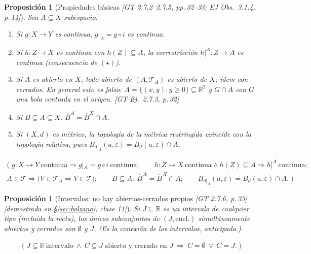 \documentclass[11pt,a4paper]{article}
\newcommand{\lgc}[1]{\par\vspace{-3pt}\begin{gather*}\big(\;#1\;\big)\end{gather*}\vspace{-6pt}}
\theoremstyle{definition}
\theoremstyle{plain}
\newtheorem{proposicion}[definicion]{Proposición}
\newcommand{\fnt}[1]{{\normalfont\small\itshape\color{gray!150!black}[#1]}}
\newcommand{\R}{\mathbb{R}}
\newcommand{\cl}[1]{\overline{#1}}
\newcommand{\Bola}[2]{B_d(#1,#2)}
\newcommand{\tp}{\mathcal{T}}
\begin{document}
\begin{proposicion}[Propiedades básicas \fnt{GT 2.7.2--2.7.5, pp.\,32--33; EJ Obs.\ 3.1.4, p.\,14}]\label{pr:subesp}
Sea $A\subseteq X$ subespacio.
\begin{enumerate}[label=(\roman*),leftmargin=2.2em,itemsep=0pt]
\item Si $g:X\to Y$ es continua, $g|_A=g\circ i$ es continua.
\item Si $h:Z\to X$ es continua con $h(Z)\subseteq A$, la correstricción $h|^A:Z\to A$ es continua (consecuencia de $(\star)$).
\item Si $A$ es abierto en $X$, todo abierto de $(A,\tp_A)$ es abierto de $X$; ídem con cerrados. En general esto es falso: $A=\{(x,y):y\ge0\}\subseteq\R^2$ y $G\cap A$ con $G$ una bola centrada en el origen. \fnt{GT Ej.\ 2.7.3, p.\,32}
\item Si $B\subseteq A\subseteq X$: $\cl{B}^{A}=\cl{B}^{X}\cap A$.
\item Si $(X,d)$ es métrico, la topología de la métrica restringida coincide con la topología relativa, pues $B_{d|_A}(a,\varepsilon)=\Bola{a}{\varepsilon}\cap A$.
\end{enumerate}
\lgc{g:X\to Y\ \text{continua}\Rightarrow g|_A=g\circ i\ \text{continua};\qquad
h:Z\to X\ \text{continua}\wedge h(Z)\subseteq A\Rightarrow h|^{A}\ \text{continua};\\
A\in\tp\Rightarrow\big(V\in\tp_A\Rightarrow V\in\tp\big);\qquad
B\subseteq A:\ \cl B^{\,A}=\cl B^{\,X}\cap A;\qquad B_{d|_A}(a,\varepsilon)=\Bola{a}{\varepsilon}\cap A.}
\end{proposicion}

\begin{proposicion}[Intervalos: no hay abiertos-cerrados propios \fnt{GT 2.7.6, p.\,33} \fnt{demostrada en \S\ref{sec:bolzano}, clase 11}]
Si $J\subseteq\R$ es un intervalo de cualquier tipo (incluida la recta), los únicos subconjuntos de $(J,\text{eucl.})$ simultáneamente abiertos y cerrados son $\emptyset$ y $J$. (Es la conexión de los intervalos, anticipada.)
\lgc{J\subseteq\R\ \text{intervalo}\ \wedge\ C\subseteq J\ \text{abierto y cerrado en } J\ \Rightarrow\ C=\emptyset\ \vee\ C=J.}
\end{proposicion}
\end{document}
